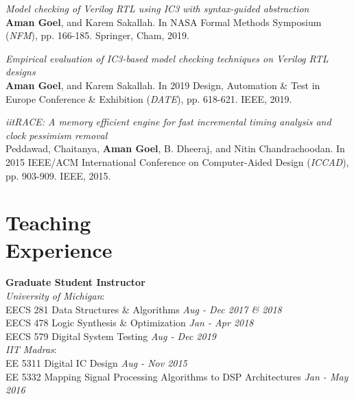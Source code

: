 \documentclass[margin,line,letter]{resume}
\begin{document}
\begin{resume}
\textit{Model checking of Verilog RTL using IC3 with syntax-guided abstraction} \\
\textbf{Aman Goel}, and Karem Sakallah. In NASA Formal Methods Symposium (\textit{NFM}), pp. 166-185. Springer, Cham, 2019.

\textit{Empirical evaluation of IC3-based model checking techniques on Verilog RTL designs} \\
\textbf{Aman Goel}, and Karem Sakallah. In 2019 Design, Automation & Test in Europe Conference & Exhibition (\textit{DATE}), pp. 618-621. IEEE, 2019.

\textit{iitRACE: A memory efficient engine for fast incremental timing analysis and clock pessimism removal} \\
Peddawad, Chaitanya, \textbf{Aman Goel}, B. Dheeraj, and Nitin Chandrachoodan. In 2015 IEEE/ACM International Conference on Computer-Aided Design (\textit{ICCAD}), pp. 903-909. IEEE, 2015.

\section{\mysidestyle Teaching\\Experience}
    \textbf{Graduate Student Instructor} \\ 
    \textit{University of Michigan}: \\
    \phantom{xx}\hspace{3ex} EECS 281 Data Structures \& Algorithms \hfill \emph{Aug - Dec 2017 \& 2018} \\
    \phantom{xx}\hspace{3ex} EECS 478 Logic Synthesis \& Optimization \hfill \emph{Jan - Apr 2018} \\
    \phantom{xx}\hspace{3ex} EECS 579 Digital System Testing \hfill \emph{Aug - Dec 2019} \\
    \textit{IIT Madras}: \\
    \phantom{xx}\hspace{3ex} EE 5311 Digital IC Design \hfill \emph{Aug - Nov 2015} \\
    \phantom{xx}\hspace{3ex} EE 5332 Mapping Signal Processing Algorithms to DSP Architectures \hfill \emph{Jan - May 2016}


\end{resume}
\end{document}
